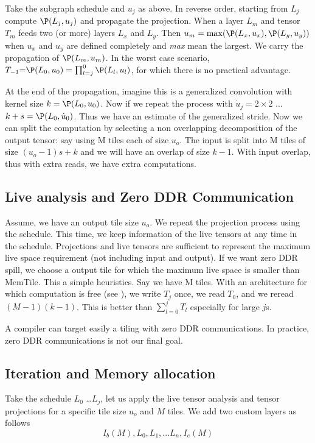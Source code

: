 \documentclass[conference]{IEEEtran}
\begin{document}
Take the subgraph schedule and $u_j$ as above. In reverse order,
starting from $L_j$ compute $\P(L_j,u_j)$ and propagate the
projection. When a layer $L_m$ and tensor $T_m$ feeds two (or more)
layers $L_x$ and $L_y$. Then $u_m = \max ( \P(L_x,u_x),\P(L_y,u_y))$
when $u_x$ and $u_y$ are defined completely and {\em max} mean the
largest. We carry the propagation of $\P(L_m,u_m)$. In the worst case
scenario, $T_{-1} \eq \P(L_0, u_0) =\prod_{l=j}^0 \P(L_l, u_l) $, for
which there is no practical advantage.

At the end of the propagation, imagine this is a generalized
convolution with kernel size $k = \P(L_0, u_0)$. Now if we repeat the
process with $\dot{u}_j = 2\times 2$ ... $k+s = \P(L_0,
\dot{u}_0)$. Thus we have an estimate of the generalized stride.  Now
we can split the computation by selecting a non overlapping
decomposition of the output tensor: say using M tiles each of size
$u_o$. The input is split into M tiles of size $(u_o-1)s+k$ and we
will have an overlap of size $k-1$. With input overlap, thus with
extra reads,  we have extra computations.

\subsection{Live analysis and Zero DDR Communication}
Assume, we have an output tile size $u_o$. We repeat the projection
process using the schedule. This time, we keep information of the live
tensors at any time in the schedule. Projections and live tensors are
sufficient to represent the maximum live space requirement (not
including input and output). If we want zero DDR spill, we choose a
output tile for which the maximum live space is smaller than
MemTile. This a simple heuristics. Say we have M tiles. With an
architecture for which computation is free (see
\cite{Hong1981IOCT,BilardiPD00}), we write $T_j$ once, we read $T_0$,
and we reread $(M-1)(k-1)$. This is better than $\sum_{l=0}^j T_l$
especially for large $j$s.

A compiler can target easily a tiling with zero DDR communications. In
practice, zero DDR communications is not our final goal.

\subsection{Iteration and Memory allocation}
Take the schedule $L_0$ \dots $L_j$, let us apply the live tensor
analysis and tensor projections for a specific tile size $u_o$ and $M$
tiles. We add two custom layers as follows
\[ I_b(M), L_0, L_1, ... L_n, I_e(M) \]
\end{document}
